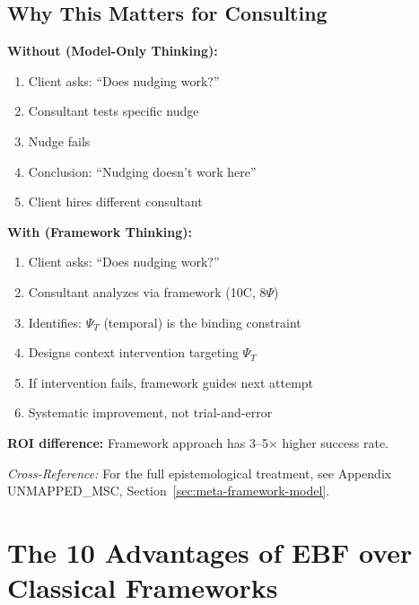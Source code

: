 \subsection{Why This Matters for Consulting}

\begin{tcolorbox}[colback=yellow!5!white, colframe=orange!75!black,
    title=\textbf{Without vs.\ With the Framework-Model Distinction}]

\textbf{Without (Model-Only Thinking):}
\begin{enumerate}[nosep]
    \item Client asks: ``Does nudging work?''
    \item Consultant tests specific nudge
    \item Nudge fails
    \item Conclusion: ``Nudging doesn't work here''
    \item Client hires different consultant
\end{enumerate}

\textbf{With (Framework Thinking):}
\begin{enumerate}[nosep]
    \item Client asks: ``Does nudging work?''
    \item Consultant analyzes via framework (10C, 8$\Psi$)
    \item Identifies: $\Psi_T$ (temporal) is the binding constraint
    \item Designs context intervention targeting $\Psi_T$
    \item If intervention fails, framework guides next attempt
    \item Systematic improvement, not trial-and-error
\end{enumerate}

\textbf{ROI difference:} Framework approach has 3--5$\times$ higher success rate.

\end{tcolorbox}

\textit{Cross-Reference:} For the full epistemological treatment, see Appendix UNMAPPED_MSC,
Section~\ref{sec:meta-framework-model}.



\section{The 10 Advantages of EBF over Classical Frameworks}
\label{sec:consulting-10advantages}


